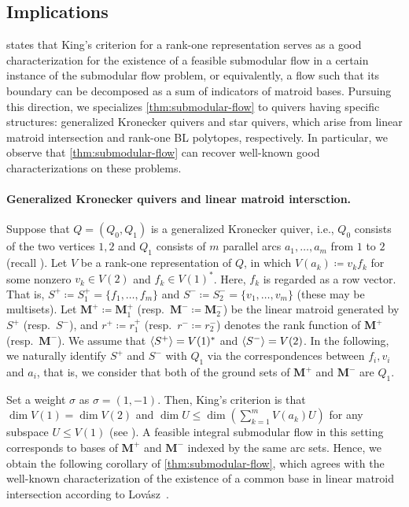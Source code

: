 \documentclass[a4paper,11pt]{article}
\numberwithin{equation}{section}
\newcommand{\M}{\mathbf{M}}
\DeclarePairedDelimiter{\spnn}{\langle}{\rangle}
\begin{document}
\subsection{Implications}

 states that King's criterion for a rank-one representation serves as a good characterization for the existence of a feasible submodular flow in a certain instance of the submodular flow problem, or equivalently, a flow such that its boundary can be decomposed as a sum of indicators of matroid bases.
Pursuing this direction, we specializes \cref{thm:submodular-flow} to quivers having specific structures:
generalized Kronecker quivers and star quivers, which arise from linear matroid intersection and rank-one BL polytopes, respectively.
In particular, we observe that \cref{thm:submodular-flow} can recover well-known good characterizations on these problems.

\paragraph{Generalized Kronecker quivers and linear matroid intersction.}

Suppose that $Q = (Q_0, Q_1)$ is a generalized Kronecker quiver, i.e.,
$Q_0$ consists of the two vertices $1, 2$ and $Q_1$ consists of $m$ parallel arcs $a_1, \dots, a_m$ from $1$ to $2$
(recall ).
Let $V$ be a rank-one representation of $Q$, in which
$V(a_k) \coloneqq v_k f_k$ for some nonzero $v_k \in V(2)$ and $f_k \in V(1)^*$.
Here, $f_k$ is regarded as a row vector.
That is,
$S^+ \coloneqq S_1^+ = \{ f_1, \dots, f_m \}$ and $S^- \coloneqq S_2^- = \{ v_1, \dotsc, v_m \}$ (these may be multisets).
Let $\M^+ \coloneqq \M_1^+$ (resp.\ $\M^- \coloneqq \M_2^-$) be the linear matroid generated by $S^+$ (resp.\ $S^-$), and $r^+ \coloneqq r_1^+$ (resp.\ $r^- \coloneqq r_2^-$) denotes the rank function of $\M^+$ (resp.\ $\M^-$).
We assume that $\spnn{S^+} = V(1)^*$ and $\spnn{S^-} = V(2)$.
In the following, we naturally identify $S^+$ and $S^-$ with $Q_1$ via the correspondences between $f_i, v_i$ and $a_i$,
that is, we consider that both of the ground sets of $\M^+$ and $\M^-$ are $Q_1$.

Set a weight $\sigma$ as $\sigma = (1,-1)$.
Then, King's criterion is that $\dim V(1) = \dim V(2)$ and $\dim U \le \dim(\sum_{k=1}^m V(a_k) U)$ for any subspace $U \le V(1)$ (see ).
A feasible integral submodular flow in this setting corresponds to bases of $\M^+$ and $\M^-$ indexed by the same arc sets.
Hence, we obtain the following corollary of \cref{thm:submodular-flow}, which agrees with the well-known characterization of the existence of a common base in linear matroid intersection according to Lov\'{a}sz~\citep{Lovasz1989}.
\end{document}

